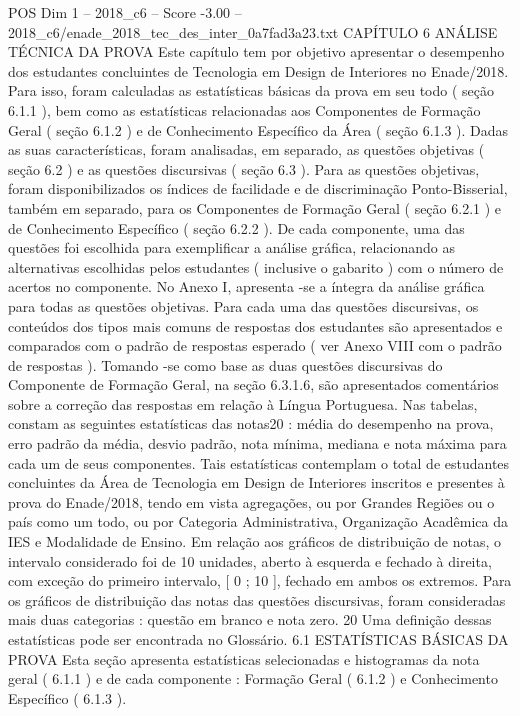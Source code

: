 \begin{textsample}{POS Dim 1 – 2018\_c6 – Score -3.00 – 2018\_c6/enade\_2018\_tec\_des\_inter\_0a7fad3a23.txt}  \label{ex:f1_pos_249}
CAPÍTULO 6 ANÁLISE TÉCNICA DA PROVA Este capítulo tem por objetivo apresentar o desempenho dos estudantes concluintes de Tecnologia em Design de Interiores no Enade/2018.
Para isso, foram calculadas as estatísticas básicas da prova em seu todo ( seção 6.1.1 ), bem como as estatísticas relacionadas aos Componentes de Formação Geral ( seção 6.1.2 ) e de Conhecimento Específico da Área ( seção 6.1.3 ).
Dadas as suas características, foram analisadas, em separado, as questões objetivas ( seção 6.2 ) e as questões discursivas ( seção 6.3 ).
Para as questões objetivas, foram disponibilizados os índices de facilidade e de discriminação Ponto-Bisserial, também em separado, para os Componentes de Formação Geral ( seção 6.2.1 ) e de Conhecimento Específico ( seção 6.2.2 ).
De cada componente, uma das questões foi escolhida para exemplificar a análise gráfica, relacionando as alternativas escolhidas pelos estudantes ( inclusive o gabarito ) com o número de acertos no componente.
No Anexo I, apresenta -se a íntegra da análise gráfica para todas as questões objetivas.
Para cada uma das questões discursivas, os conteúdos dos tipos mais comuns de respostas dos estudantes são apresentados e comparados com o padrão de respostas esperado ( ver Anexo VIII com o padrão de respostas ).
Tomando -se como base as duas questões discursivas do Componente de Formação Geral, na seção 6.3.1.6, são apresentados comentários sobre a correção das respostas em relação à Língua Portuguesa.
Nas tabelas, constam as seguintes estatísticas das notas20 : média do desempenho na prova, erro padrão da média, desvio padrão, nota mínima, mediana e nota máxima para cada um de seus componentes.
Tais estatísticas contemplam o total de estudantes concluintes da Área de Tecnologia em Design de Interiores inscritos e presentes à prova do Enade/2018, tendo em vista agregações, ou por Grandes Regiões ou o país como um todo, ou por Categoria Administrativa, Organização Acadêmica da IES e Modalidade de Ensino.
Em relação aos gráficos de distribuição de notas, o intervalo considerado foi de 10 unidades, aberto à esquerda e fechado à direita, com exceção do primeiro intervalo, [ 0 ; 10 ], fechado em ambos os extremos.
Para os gráficos de distribuição das notas das questões discursivas, foram consideradas mais duas categorias : questão em branco e nota zero. 20 Uma definição dessas estatísticas pode ser encontrada no Glossário. 6.1 ESTATÍSTICAS BÁSICAS DA PROVA Esta seção apresenta estatísticas selecionadas e histogramas da nota geral ( 6.1.1 ) e de cada componente : Formação Geral ( 6.1.2 ) e Conhecimento Específico ( 6.1.3 ).

\end{textsample}
